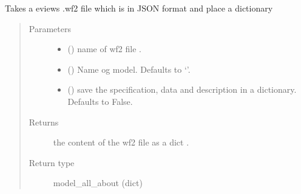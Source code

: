 \documentclass[letterpaper,10pt,english]{sphinxmanual}
\begin{document}
\begin{fulllineitems}
\label{\detokenize{onboard/modelgrabwf2:modelgrabwf2.wf2_to_clean}}
\pysigstartsignatures
{}
\pysigstopsignatures
\sphinxAtStartPar
Takes a eviews .wf2 file \sphinxhyphen{} which is in JSON format \sphinxhyphen{} and place a
dictionary
\begin{quote}\begin{description}
\item[{Parameters}] \leavevmode\begin{itemize}
\item {} 
\sphinxAtStartPar
{} () \textendash{} name of wf2 file .

\item {} 
\sphinxAtStartPar
{} (\sphinxstyleliteralemphasis{\sphinxupquote{, }}) \textendash{} Name og model. Defaults to ‘’.

\item {} 
\sphinxAtStartPar
{} (\sphinxstyleliteralemphasis{\sphinxupquote{, }}) \textendash{} save the specification, data and description in a dictionary. Defaults to False.

\end{itemize}

\item[{Returns}] \leavevmode
\sphinxAtStartPar
the content of the wf2 file as a dict .

\item[{Return type}] \leavevmode
\sphinxAtStartPar
model\_all\_about (dict)

\end{description}\end{quote}

\end{fulllineitems}

\end{document}

